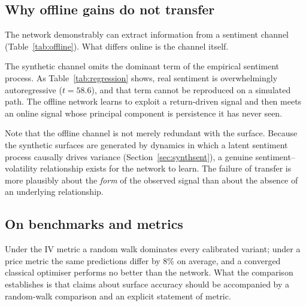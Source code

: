 \documentclass[11pt,a4paper]{article}
\begin{document}
\subsection{Why offline gains do not transfer}
The network demonstrably can extract information from a sentiment channel
(Table~\ref{tab:offline}). What differs online is the channel itself.

The synthetic channel omits the dominant term of the empirical sentiment
process. As Table~\ref{tab:regression} shows, real sentiment is overwhelmingly
autoregressive ($t = 58.6$), and that term cannot be reproduced on a simulated
path. The offline network learns to exploit a return-driven signal and then
meets an online signal whose principal component is persistence it has never
seen.

Note that the offline channel is not merely redundant with the surface. Because
the synthetic surfaces are generated by dynamics in which a latent sentiment
process causally drives variance (Section~\ref{sec:synthsent}), a genuine
sentiment--volatility relationship exists for the network to learn. The failure
of transfer is more plausibly about the \emph{form} of the observed signal than
about the absence of an underlying relationship.

\subsection{On benchmarks and metrics}
Under the IV metric a random walk dominates every calibrated variant; under a
price metric the same predictions differ by 8\% on average, and a converged
classical optimiser performs no better than the network. What the comparison
establishes is that claims about surface accuracy should be accompanied by a
random-walk comparison and an explicit statement of metric.
\end{document}
